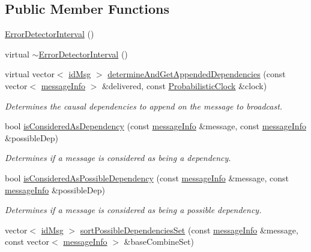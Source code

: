 \subsection*{Public Member Functions}
\begin{DoxyCompactItemize}
\item 
\hyperlink{class_error_detector_interval_a31b5edf31d0bfa45dfe4d0e4733d59b2}{Error\+Detector\+Interval} ()
\item 
virtual \hyperlink{class_error_detector_interval_a13501d384b2f53dd19dfa1dd9ee0f8fe}{$\sim$\+Error\+Detector\+Interval} ()
\item 
virtual vector$<$ \hyperlink{structures_8h_a83a1d9a070efa5341da84cfd8e28d3e5}{id\+Msg} $>$ \hyperlink{class_error_detector_interval_a6cb5dc28ef7349060d15727e92a6780a}{determine\+And\+Get\+Appended\+Dependencies} (const vector$<$ \hyperlink{structures_8h_a7e7bdc1d2fff8a9436f2f352b2711ed6}{message\+Info} $>$ \&delivered, const \hyperlink{class_probabilistic_clock}{Probabilistic\+Clock} \&clock)
\begin{DoxyCompactList}\small\item\em Determines the causal dependencies to append on the message to broadcast. \end{DoxyCompactList}\item 
bool \hyperlink{class_error_detector_interval_a27cb3ca9d7e5c3ddda9ee5ee66f182ed}{is\+Considered\+As\+Dependency} (const \hyperlink{structures_8h_a7e7bdc1d2fff8a9436f2f352b2711ed6}{message\+Info} \&message, const \hyperlink{structures_8h_a7e7bdc1d2fff8a9436f2f352b2711ed6}{message\+Info} \&possible\+Dep)
\begin{DoxyCompactList}\small\item\em Determines if a message is considered as being a dependency. \end{DoxyCompactList}\item 
bool \hyperlink{class_error_detector_interval_a33bf470042fb65d833fd0f091374a046}{is\+Considered\+As\+Possible\+Dependency} (const \hyperlink{structures_8h_a7e7bdc1d2fff8a9436f2f352b2711ed6}{message\+Info} \&message, const \hyperlink{structures_8h_a7e7bdc1d2fff8a9436f2f352b2711ed6}{message\+Info} \&possible\+Dep)
\begin{DoxyCompactList}\small\item\em Determines if a message is considered as being a possible dependency. \end{DoxyCompactList}\item 
vector$<$ \hyperlink{structures_8h_a83a1d9a070efa5341da84cfd8e28d3e5}{id\+Msg} $>$ \hyperlink{class_error_detector_interval_ae74b39e397894e3485c2f7869fca8fb0}{sort\+Possible\+Dependencies\+Set} (const \hyperlink{structures_8h_a7e7bdc1d2fff8a9436f2f352b2711ed6}{message\+Info} \&message, const vector$<$ \hyperlink{structures_8h_a7e7bdc1d2fff8a9436f2f352b2711ed6}{message\+Info} $>$ \&base\+Combine\+Set)

\end{DoxyCompactItemize}
